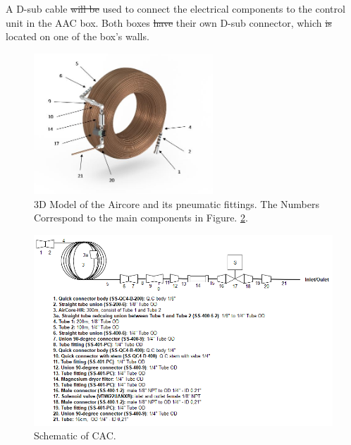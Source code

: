 \documentclass[a4paper,12pt,oneside]{article}
\providecommand{\DIFaddtex}[1]{{\protect\color{blue}\uwave{#1}}} %
\providecommand{\DIFdeltex}[1]{{\protect\color{red}\sout{#1}}}                      %
\providecommand{\DIFaddbegin}{} %
\providecommand{\DIFaddend}{} %
\providecommand{\DIFdelbegin}{} %
\providecommand{\DIFdelend}{} %
\providecommand{\DIFadd}[1]{\texorpdfstring{\DIFaddtex{#1}}{#1}} %
\providecommand{\DIFdel}[1]{\texorpdfstring{\DIFdeltex{#1}}{}} %
\newcommand{\DIFscaledelfig}{0.5}
\newlength{\DIFdelgraphicswidth} %
\newlength{\DIFdelgraphicsheight} %
\newcommand{\DIFaddincludegraphics}[2][]{{\color{blue}\fbox{\DIFOincludegraphics[#1]{#2}}}} %
\newcommand{\DIFdelincludegraphics}[2][]{%
\sbox{\DIFdelgraphicsbox}{\DIFOincludegraphics[#1]{#2}}%
\settoboxwidth{\DIFdelgraphicswidth}{\DIFdelgraphicsbox} %
\settoboxtotalheight{\DIFdelgraphicsheight}{\DIFdelgraphicsbox} %
\scalebox{\DIFscaledelfig}{%
\parbox[b]{\DIFdelgraphicswidth}{\usebox{\DIFdelgraphicsbox}\\[-\baselineskip] \rule{\DIFdelgraphicswidth}{0em}}\llap{\resizebox{\DIFdelgraphicswidth}{\DIFdelgraphicsheight}{%
\setlength{\unitlength}{\DIFdelgraphicswidth}%
\begin{picture}(1,1)%
\thicklines\linethickness{2pt} %
{\color[rgb]{1,0,0}\put(0,0){\framebox(1,1){}}}%
{\color[rgb]{1,0,0}\put(0,0){\line( 1,1){1}}}%
{\color[rgb]{1,0,0}\put(0,1){\line(1,-1){1}}}%
\end{picture}%
}\hspace*{3pt}}} %
} %
\DeclareRobustCommand{\DIFaddbegin}{\DIFOaddbegin \let\includegraphics\DIFaddincludegraphics} %
\DeclareRobustCommand{\DIFaddend}{\DIFOaddend \let\includegraphics\DIFOincludegraphics} %
\DeclareRobustCommand{\DIFdelbegin}{\DIFOdelbegin \let\includegraphics\DIFdelincludegraphics} %
\DeclareRobustCommand{\DIFdelend}{\DIFOaddend \let\includegraphics\DIFOincludegraphics} %
\begin{document}
A D-sub cable \DIFdelbegin \DIFdel{will be }\DIFdelend \DIFaddbegin \DIFadd{was }\DIFaddend used to connect the electrical components to the control unit in the AAC box. Both boxes \DIFdelbegin \DIFdel{have }\DIFdelend \DIFaddbegin \DIFadd{had }\DIFaddend their own D-sub connector, which \DIFdelbegin \DIFdel{is }\DIFdelend \DIFaddbegin \DIFadd{was }\DIFaddend located on one of the box's walls.


\begin{figure}[H]
    \centering
    \includegraphics[width=0.6\textwidth]{4-experiment-design/img/Mechanical/CAC_labels.jpg}
    \caption{3D Model of the Aircore and its pneumatic fittings. The Numbers Correspond to the main components in Figure. \ref{fig:CAC-schematic}.}
    \label{fig:CAC-cad-model}
\end{figure}

\begin{landscape}
\begin{figure}[H]
    \centering
    \includegraphics[width=1.3\textwidth]{4-experiment-design/img/Mechanical/CAC-schematic.PNG}
    \caption{Schematic of CAC.}
    \label{fig:CAC-schematic}
\end{figure}
\end{landscape}
\smallskip
\end{document}
